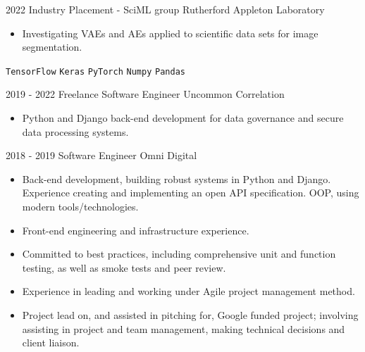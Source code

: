 \documentclass[9pt]{developercv} %
\begin{document}
\begin{entrylist}
    \entry
		{2022}
		{Industry Placement - SciML group}
		{Rutherford Appleton Laboratory}
  		{\vspace{-10pt}
        \begin{itemize}[noitemsep,topsep=0pt,parsep=0pt,partopsep=0pt, leftmargin=-1pt]
            \item Investigating VAEs and AEs applied to scientific data sets for image segmentation.
        \end{itemize}
        \texttt{TensorFlow} \slashsep \texttt{Keras} \slashsep \texttt{PyTorch} \slashsep \texttt{Numpy} \slashsep \texttt{Pandas}} 
    \entry
        {2019 - 2022}
		{Freelance Software Engineer}
		{Uncommon Correlation}
		{\vspace{-10pt}
        \begin{itemize}[noitemsep,topsep=0pt,parsep=0pt,partopsep=0pt, leftmargin=-1pt]
            \item Python and Django back-end development for data governance and secure data processing systems.
        \end{itemize}}
	\entry
        {2018 - 2019}
		{Software Engineer}
		{Omni Digital}
		{\vspace{-10pt}
        \begin{itemize}[noitemsep,topsep=0pt,parsep=0pt,partopsep=0pt, leftmargin=-1pt]
            \item Back-end development,  building robust systems in Python and Django. Experience creating and implementing an open API specification. OOP, using modern tools/technologies.
            \item Front-end engineering and infrastructure experience.
            \item Committed to best practices, including comprehensive unit and function testing, as well as smoke tests and peer review.
            \item Experience in leading and working under Agile project management method.
            \item Project lead on, and assisted in pitching for, Google funded project; involving assisting in project and team management, making technical decisions and client liaison.
        \end{itemize} 
}
\end{entrylist}
\end{document}
